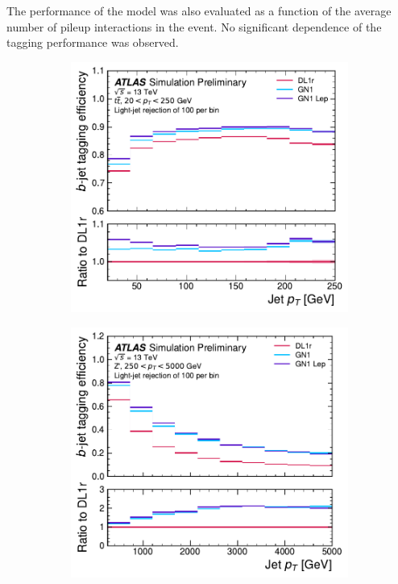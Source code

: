 The performance of the model was also evaluated as a function of the average number of pileup interactions in the event. No significant dependence of the tagging performance was observed.


\begin{figure}[!htbp]
    \centering
    \begin{subfigure}[b]{0.48\textwidth}
        \centering
        \includegraphics[width=\textwidth]{chapters/gnn_tagger/figs/results/main/ttbar/ttbar_flat_leff_by_pt_btag.pdf}
    \end{subfigure}
    \quad
    \begin{subfigure}[b]{0.48\textwidth}
        \centering
        \includegraphics[width=\textwidth]{chapters/gnn_tagger/figs/results/main/zprime/zprime_flat_leff_by_pt_btag.pdf}

\end{subfigure}
\end{figure}

